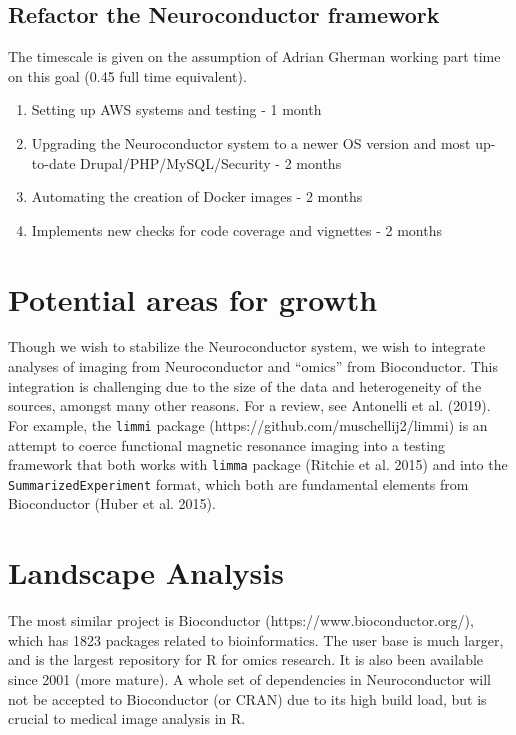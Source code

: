 \documentclass[]{elsarticle} %
\providecommand{\tightlist}{%
  \setlength{\itemsep}{0pt}\setlength{\parskip}{0pt}}
\begin{document}
\hypertarget{refactor-the-neuroconductor-framework-1}{%
\subsection{Refactor the Neuroconductor framework}\label{refactor-the-neuroconductor-framework-1}}

The timescale is given on the assumption of Adrian Gherman working part
time on this goal (0.45 full time equivalent).

\begin{enumerate}
\def\labelenumi{\arabic{enumi}.}
\tightlist
\item
  Setting up AWS systems and testing - 1 month
\item
  Upgrading the Neuroconductor system to a newer OS version and most up-to-date Drupal/PHP/MySQL/Security - 2 months
\item
  Automating the creation of Docker images - 2 months
\item
  Implements new checks for code coverage and vignettes - 2 months
\end{enumerate}

\hypertarget{potential-areas-for-growth}{%
\section{Potential areas for growth}\label{potential-areas-for-growth}}

Though we wish to stabilize the Neuroconductor system, we wish to integrate analyses of imaging from Neuroconductor and ``omics'' from Bioconductor. This integration is challenging due to the size of the data and heterogeneity of the sources, amongst many other reasons. For a review, see Antonelli et al. (2019). For example, the \texttt{limmi} package (https://github.com/muschellij2/limmi) is an attempt to coerce functional magnetic resonance imaging into a testing framework that both works with \texttt{limma} package (Ritchie et al. 2015) and into the \texttt{SummarizedExperiment} format, which both are fundamental elements from Bioconductor (Huber et al. 2015).

\hypertarget{landscape-analysis}{%
\section{Landscape Analysis}\label{landscape-analysis}}

The most similar project is Bioconductor (https://www.bioconductor.org/), which has 1823 packages related to bioinformatics. The user base is much larger, and is the largest repository for R for omics research. It is also been available since 2001 (more mature). A whole set of dependencies in Neuroconductor will not be accepted to Bioconductor (or CRAN) due to its high build load, but is crucial to medical image analysis in R.
\end{document}
